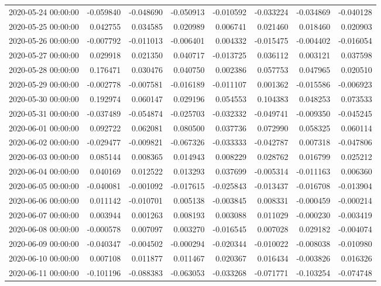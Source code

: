 \begin{tabular}{lrrrrrrr}
2020-05-24 00:00:00 & -0.059840 & -0.048690 & -0.050913 & -0.010592 & -0.033224 & -0.034869 & -0.040128 \\
2020-05-25 00:00:00 & 0.042755 & 0.034585 & 0.020989 & 0.006741 & 0.021460 & 0.018460 & 0.020903 \\
2020-05-26 00:00:00 & -0.007792 & -0.011013 & -0.006401 & 0.004332 & -0.015475 & -0.004402 & -0.016054 \\
2020-05-27 00:00:00 & 0.029918 & 0.021350 & 0.040717 & -0.013725 & 0.036112 & 0.003121 & 0.037598 \\
2020-05-28 00:00:00 & 0.176471 & 0.030476 & 0.040750 & 0.002386 & 0.057753 & 0.047965 & 0.020510 \\
2020-05-29 00:00:00 & -0.002778 & -0.007581 & -0.016189 & -0.011107 & 0.001362 & -0.015586 & -0.006923 \\
2020-05-30 00:00:00 & 0.192974 & 0.060147 & 0.029196 & 0.054553 & 0.104383 & 0.048253 & 0.073533 \\
2020-05-31 00:00:00 & -0.037489 & -0.054874 & -0.025703 & -0.032332 & -0.049741 & -0.009350 & -0.045245 \\
2020-06-01 00:00:00 & 0.092722 & 0.062081 & 0.080500 & 0.037736 & 0.072990 & 0.058325 & 0.060114 \\
2020-06-02 00:00:00 & -0.029477 & -0.009821 & -0.067326 & -0.033333 & -0.042787 & 0.007318 & -0.047806 \\
2020-06-03 00:00:00 & 0.085144 & 0.008365 & 0.014943 & 0.008229 & 0.028762 & 0.016799 & 0.025212 \\
2020-06-04 00:00:00 & 0.040169 & 0.012522 & 0.013293 & 0.037699 & -0.005314 & -0.011163 & 0.006360 \\
2020-06-05 00:00:00 & -0.040081 & -0.001092 & -0.017615 & -0.025843 & -0.013437 & -0.016708 & -0.013904 \\
2020-06-06 00:00:00 & 0.011142 & -0.010701 & 0.005138 & -0.003845 & 0.008331 & -0.000459 & -0.000214 \\
2020-06-07 00:00:00 & 0.003944 & 0.001263 & 0.008193 & 0.003088 & 0.011029 & -0.000230 & -0.003419 \\
2020-06-08 00:00:00 & -0.000578 & 0.007097 & 0.003270 & -0.016545 & 0.007028 & 0.029182 & -0.004074 \\
2020-06-09 00:00:00 & -0.040347 & -0.004502 & -0.000294 & -0.020344 & -0.010022 & -0.008038 & -0.010980 \\
2020-06-10 00:00:00 & 0.007108 & 0.011877 & 0.011467 & 0.020367 & 0.016434 & -0.003826 & 0.016326 \\
2020-06-11 00:00:00 & -0.101196 & -0.088383 & -0.063053 & -0.033268 & -0.071771 & -0.103254 & -0.074748 \\

\end{tabular}
